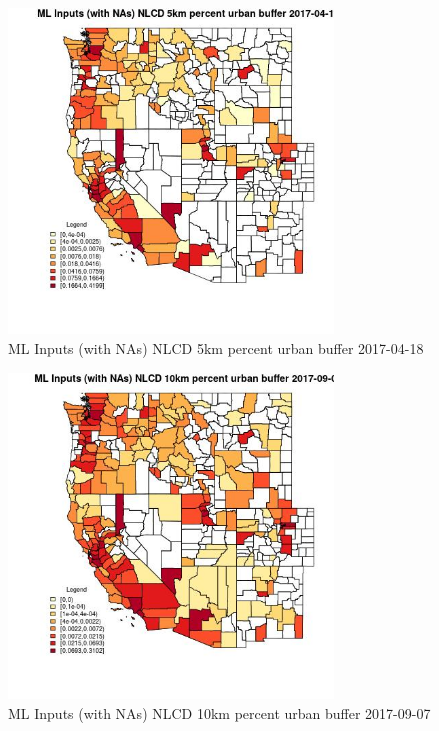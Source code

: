 \begin{figure} 
\centering  
\includegraphics[width=0.77\textwidth]{Code_Outputs/Report_ML_input_PM25_Step4_part_e_de_duplicated_aves_compiled_2019-05-20wNAs_CountyNLCD_5km_percent_urban_bufferMean2017-04-18.jpg} 
\caption{\label{fig:Report_ML_input_PM25_Step4_part_e_de_duplicated_aves_compiled_2019-05-20wNAsCountyNLCD_5km_percent_urban_bufferMean2017-04-18}ML Inputs (with NAs) NLCD 5km percent urban buffer 2017-04-18} 
\end{figure} 
 

\begin{figure} 
\centering  
\includegraphics[width=0.77\textwidth]{Code_Outputs/Report_ML_input_PM25_Step4_part_e_de_duplicated_aves_compiled_2019-05-20wNAs_CountyNLCD_10km_percent_urban_bufferMean2017-09-07.jpg} 
\caption{\label{fig:Report_ML_input_PM25_Step4_part_e_de_duplicated_aves_compiled_2019-05-20wNAsCountyNLCD_10km_percent_urban_bufferMean2017-09-07}ML Inputs (with NAs) NLCD 10km percent urban buffer 2017-09-07} 
\end{figure} 
 

